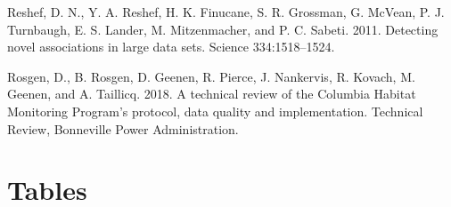 \documentclass[
  12pt,
]{article}
\begin{document}
\leavevmode\hypertarget{ref-Reshef2011}{}%
Reshef, D. N., Y. A. Reshef, H. K. Finucane, S. R. Grossman, G. McVean, P. J. Turnbaugh, E. S. Lander, M. Mitzenmacher, and P. C. Sabeti. 2011. Detecting novel associations in large data sets. Science 334:1518--1524.

\leavevmode\hypertarget{ref-Rosgen2018}{}%
Rosgen, D., B. Rosgen, D. Geenen, R. Pierce, J. Nankervis, R. Kovach, M. Geenen, and A. Taillicq. 2018. A technical review of the Columbia Habitat Monitoring Program's protocol, data quality and implementation. Technical Review, Bonneville Power Administration.

\newpage

\hypertarget{tables}{%
\section{Tables}\label{tables}}

\begingroup\fontsize{10}{12}\selectfont
\end{document}

